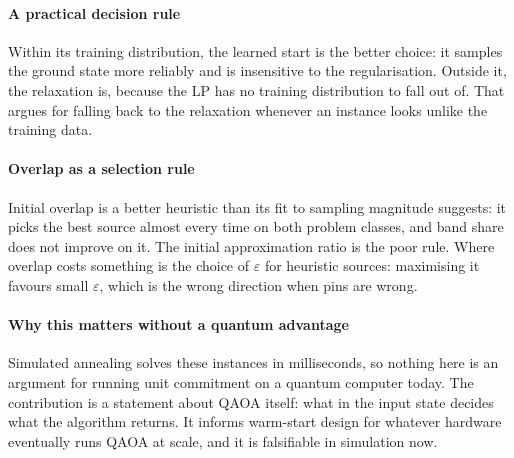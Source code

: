 \paragraph{A practical decision rule} Within its training distribution, the learned start is the better choice: it samples the ground state more reliably and is insensitive to the regularisation. Outside it, the relaxation is, because the LP has no training distribution to fall out of. That argues for falling back to the relaxation whenever an instance looks unlike the training data.

\paragraph{Overlap as a selection rule} Initial overlap is a better heuristic than its fit to sampling magnitude suggests: it picks the best source almost every time on both problem classes, and band share does not improve on it. The initial approximation ratio is the poor rule. Where overlap costs something is the choice of $\varepsilon$ for heuristic sources: maximising it favours small $\varepsilon$, which is the wrong direction when pins are wrong.

\paragraph{Why this matters without a quantum advantage} Simulated annealing solves these instances in milliseconds, so nothing here is an argument for running unit commitment on a quantum computer today. The contribution is a statement about QAOA itself: what in the input state decides what the algorithm returns. It informs warm-start design for whatever hardware eventually runs QAOA at scale, and it is falsifiable in simulation now.


